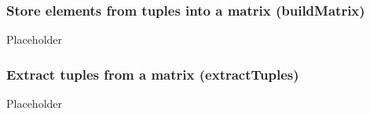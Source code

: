 \subsubsection{Store elements from tuples into a matrix ({\sf buildMatrix})}

Placeholder

\subsubsection{Extract tuples from a matrix ({\sf extractTuples})}

Placeholder
